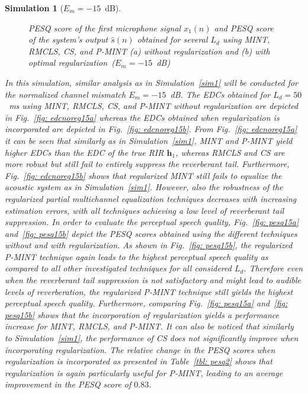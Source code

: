 \documentclass[10pt]{IEEEtran}
\newtheorem{simulation}{Simulation}
\begin{document}
\begin{simulation}[$E_m=-15$~dB]
\begin{figure}[t!]
{{    }}
  \caption{PESQ score of the first microphone signal $x_1(n)$ and PESQ score of the system's output $\hat{s}(n)$ obtained for several $L_d$ using MINT, RMCLS, CS, and P-MINT (a) without regularization and (b) with optimal regularization~($E_m = -15$~dB)}
\end{figure}
In this simulation, similar analysis as in Simulation~\ref{sim1} will be conducted for the normalized channel mismatch $E_m = -15$~dB.
The EDCs obtained for $L_d = 50$~ms using MINT, RMCLS, CS, and P-MINT without regularization are depicted in Fig.~\ref{fig: edcnoreg15a} whereas the EDCs obtained when regularization is incorporated are depicted in Fig.~\ref{fig: edcnoreg15b}.
From Fig.~\ref{fig: edcnoreg15a} it can be seen that similarly as in Simulation~\ref{sim1}, MINT and P-MINT yield higher EDCs than the EDC of the true RIR $\mathbf{h}_1$, whereas RMCLS and CS are more robust but still fail to entirely suppress the reverberant tail.
Furthermore, Fig.~\ref{fig: edcnoreg15b} shows that regularized MINT still fails to equalize the acoustic system as in Simulation~\ref{sim1}.
However, also the robustness of the regularized partial multichannel equalization techniques decreases with increasing estimation errors, with all techniques achieving a low level of reverberant tail suppression.
In order to evaluate the perceptual speech quality, Fig.~\ref{fig: pesq15a} and~\ref{fig: pesq15b} depict the PESQ scores obtained using the different techniques without and with regularization.
As shown in Fig.~\ref{fig: pesq15b}, the regularized P-MINT technique again leads to the highest perceptual speech quality as compared to all other investigated techniques for all considered $L_d$. Therefore even when the reverberant tail suppression is not satisfactory and might lead to audible levels of reverberation, the regularized P-MINT technique still yields the highest perceptual speech quality. 
Furthermore, comparing Fig.~\ref{fig: pesq15a} and~\ref{fig: pesq15b} shows that the incorporation of regularization yields a performance increase for MINT, RMCLS, and P-MINT.
It can also be noticed that similarly to Simulation~\ref{sim1}, the performance of CS does not significantly improve when incorporating regularization.
The relative change in the PESQ scores when regularization is incorporated as presented in Table~\ref{tbl: pesq2} shows that regularization is again particularly useful for P-MINT, leading to an average improvement in the PESQ score of $0.83$.

\end{simulation}
\end{document}
